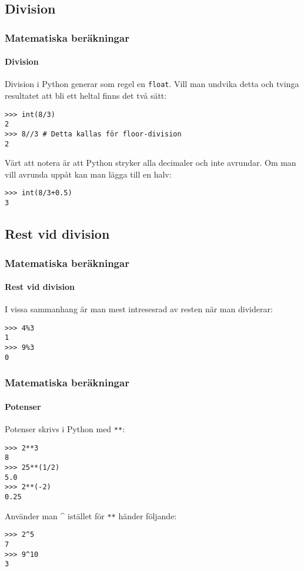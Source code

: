 \documentclass[aspectratio=169]{beamer}
\begin{document}
\subsection{Division}

\begin{frame}[fragile]
	\frametitle{Matematiska beräkningar}
	\framesubtitle{Division}
	
	Division i Python generar som regel en \texttt{float}. Vill man undvika detta och tvinga resultatet att bli ett heltal finns det två sätt:
	\begin{lstlisting}
>>> int(8/3)
2
>>> 8//3 # Detta kallas för floor-division
2
	\end{lstlisting}
	
	Värt att notera är att Python stryker alla decimaler och inte avrundar. Om man vill avrunda uppåt kan man \pause lägga till en halv:
	
	\begin{lstlisting}
>>> int(8/3+0.5)
3
	\end{lstlisting}

\end{frame}

\subsection{Rest vid division}

\begin{frame}[fragile]
	\frametitle{Matematiska beräkningar}
	\framesubtitle{Rest vid division}
	
	I vissa sammanhang är man mest intresesrad av resten när man dividerar:
	
	\begin{lstlisting}
>>> 4%3
1
>>> 9%3
0
	\end{lstlisting}

\end{frame}

\begin{frame}[fragile]
	\frametitle{Matematiska beräkningar}
	\framesubtitle{Potenser}
	
	Potenser skrivs i Python med \lstinline{**}:
	
	\begin{lstlisting}
>>> 2**3
8
>>> 25**(1/2)
5.0
>>> 2**(-2)
0.25
\end{lstlisting} \pause
Använder man \^{} istället för \lstinline{**} händer följande:
	\begin{lstlisting}
>>> 2^5
7
>>> 9^10
3
	\end{lstlisting}

\end{frame}
\end{document}
